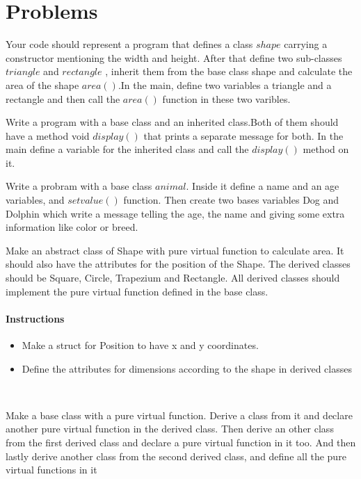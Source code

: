 \documentclass[11pt,fleqn]{book} %
\begin{document}
\section{Problems} 
\begin{problem}
  Your code should represent a program that defines a class $shape$ carrying a constructor mentioning the width and height. After that define two sub-classes $triangle$ and $rectangle$ , inherit them from the base class shape and calculate the area of the shape $area()$.In the main, define two variables a triangle and a rectangle and then call the $area()$ function in these two varibles.\\
\end{problem}
\begin{problem}
  Write a program with a base class and an inherited class.Both of them should have a method void $display()$ that prints a separate message for both. In the main define a variable for the inherited class and call the $display()$ method on it.\\
\end{problem}
\begin{problem}
  Write a probram with a base class $animal$. Inside it define a name and an age variables, and $setvalue()$ function. Then create two bases variables Dog and Dolphin which write a message telling the age, the name and giving some extra information like color or breed.
\end{problem}
\begin{problem}
  Make an abstract class of Shape with pure virtual function to calculate area. It should also have the attributes for the position of the Shape. The derived classes should be Square, Circle, Trapezium and Rectangle. All derived classes should implement the pure virtual function defined in the base class. 
  \paragraph{Instructions}
  \begin{itemize}
  \item Make a struct for Position to have x and y coordinates.
  \item Define the attributes for dimensions according to the shape in derived classes
  \end{itemize}
\end{problem} ~\\
\begin{problem}
  Make a base class with a pure virtual function. Derive a class from it and declare another pure virtual function in the derived class. Then derive an other class from the first derived class and declare a pure virtual function in it too. And then lastly derive another class from the second derived class, and define all the pure virtual functions in it
\end{problem}
\end{document}
